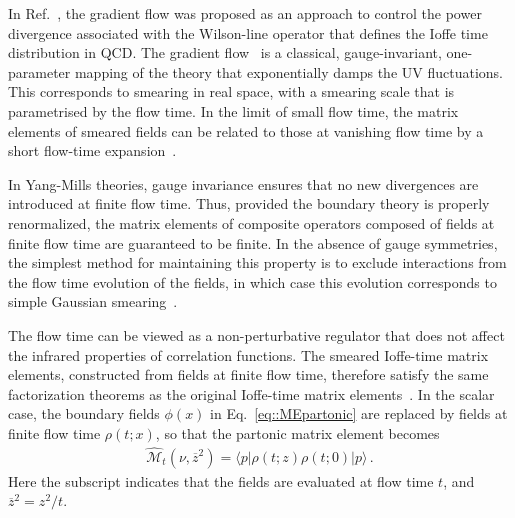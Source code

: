 In Ref.~\cite{Monahan:2016bvm,Monahan:2017hpu}, the gradient flow was proposed
as an approach to control the power divergence associated with the Wilson-line
operator that defines the Ioffe time distribution in QCD. The gradient
flow~\cite{Narayanan:2006rf,Luscher:2011bx,Luscher:2013cpa} is a classical,
gauge-invariant, one-parameter mapping of the theory that exponentially damps
the UV fluctuations. This corresponds to smearing in real space, with a smearing
scale that is parametrised by the flow time. In the limit of small flow time,
the matrix elements of smeared fields can be related to those at vanishing flow
time by a short flow-time expansion~\cite{Luscher:2013vga}.

In Yang-Mills theories, gauge invariance ensures that no new divergences are
introduced at finite flow time. Thus, provided the boundary theory is properly
renormalized, the matrix elements of composite operators composed of fields at
finite flow time are guaranteed to be finite. In the absence of gauge
symmetries, the simplest method for maintaining this property is to exclude
interactions from the flow time evolution of the fields, in which case this
evolution corresponds to simple Gaussian
smearing~\cite{Monahan:2015lha,Monahan:2015fjf,Fujikawa:2016qis}. 

The flow time can be viewed as a non-perturbative regulator that does not affect
the infrared properties of correlation functions. The smeared Ioffe-time matrix
elements, constructed from fields at finite flow time, therefore satisfy the
same factorization theorems as the original Ioffe-time matrix
elements~\cite{Monahan:2016bvm}. In the scalar case, the boundary fields
$\phi(x)$ in Eq.~\eqref{eq::MEpartonic} are replaced by fields at finite
flow time $\rho(t;x)$, so that the partonic matrix element becomes
\begin{align}
        \label{eq::MEflow}
        \widehat{\mathcal{M}}_t\left(\nu,\overline{z}^2\right) = 
        \langle p | \rho\left(t;z\right)\rho\left(t;0\right)  | p \rangle\, .
\end{align}
Here the subscript indicates that the fields are evaluated at flow time $t$, and
$\overline{z}^2 = z^2/t$. 


